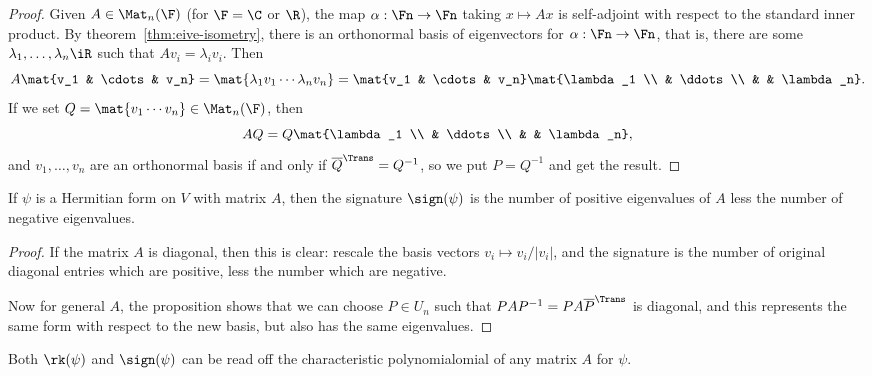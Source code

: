 \begin{proof}
	Given $A\in\Mat_n(\F)$ (for $\F=\C$ or $\R$), the map $\alpha:\Fn\to\Fn$ taking $x\mapsto Ax$ is self-adjoint with respect to the standard inner product. By theorem~\ref{thm:eive-isometry}, there is an orthonormal basis of eigenvectors for $\alpha:\Fn\to\Fn$, that is, there are some $\lambda_1,\ldots,\lambda_n\iR$ such that $Av_i = \lambda_i v_i$. Then %
	\begin{equation*}
		A \mat{v_1 & \cdots & v_n}
		= \mat{\lambda_1 v_1 \cdots \lambda_n v_n}
		= \mat{v_1 & \cdots & v_n} \mat{\lambda_1 \\ & \ddots \\ & & \lambda_n}.
	\end{equation*}
	If we set $Q=\mat{v_1 \cdots v_n} \in \Mat_n(\F)$, then
	\begin{equation*}
		AQ = Q \mat{\lambda_1 \\ & \ddots \\ & & \lambda_n},
	\end{equation*}
	and $v_1,\ldots,v_n$ are an orthonormal basis if and only if $\herm{Q}=Q^{-1}$, so we put $P=Q^{-1}$ and get the result. %
\end{proof}

\begin{corollary}
	If $\psi$ is a Hermitian form on $V$ with matrix $A$, then the signature $\sign(\psi)$ is the number of positive eigenvalues of $A$ less the number of negative eigenvalues. 
\end{corollary}

\begin{proof}
	If the matrix $A$ is diagonal, then this is clear: rescale the basis vectors $v_i \mapsto v_i/\left\vert v_i \right\vert$, and the signature is the number of original diagonal entries which are positive, less the number which are negative. %
	
	Now for general $A$, the proposition shows that we can choose $P\in U_n$ such that $PAP^{-1} = PA\herm{P}$ is diagonal, and this represents the same form with respect to the new basis, but also has the same eigenvalues. %
\end{proof}

\begin{corollary}
	Both $\rk(\psi)$ and $\sign(\psi)$ can be read off the characteristic polynomialomial of any matrix $A$ for $\psi$. %
\end{corollary}

